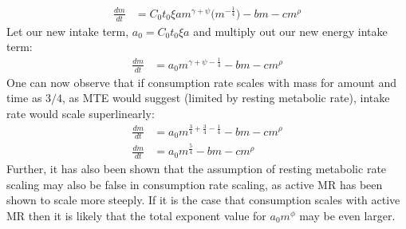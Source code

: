 \documentclass[a4paper]{article} %
\begin{document}
\begin{align}
    \frac{dm}{dt} &= C_{0}t_{0}\xi am^{\gamma + \psi}\Big(m^{-\frac{1}{4}}\Big) - bm - cm^{\rho}
\end{align}
Let our new intake term, $a_0 = C_{0}t_{0}\xi a$ and multiply out our new energy intake term:
\begin{align}
    \frac{dm}{dt} &= a_{0}m^{\gamma + \psi -\frac{1}{4}} - bm - cm^{\rho}
\end{align}
One can now observe that if consumption rate scales with mass for amount and time as $3/4$, as MTE would suggest (limited by resting metabolic rate), intake rate would scale superlinearly:
\begin{align}
    \frac{dm}{dt} &= a_{0}m^{\frac{3}{4} + \frac{3}{4} -\frac{1}{4}} - bm - cm^{\rho} \\
    \frac{dm}{dt} &= a_{0}m^{\frac{5}{4}} - bm - cm^{\rho}
\end{align}
Further, it has also been shown that the assumption of resting metabolic rate scaling may also be false in consumption rate scaling, as active MR has been shown to scale more steeply. If it is the case that consumption scales with active MR then it is likely that the total exponent value for $a_{0}m^\phi$ may be even larger.
\end{document}
